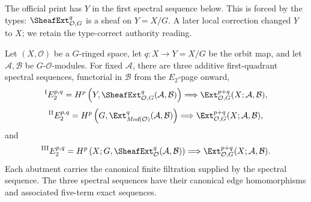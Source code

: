 \begin{lemma}
\label{lemma-equivariant-ext-spectral-sequences}
\begin{reference}
\cite[Chapter V, \S 5.6, pp. 216--217]{Tohoku}
\end{reference}
\begin{history}
The official print has $Y$ in the first spectral sequence below. This is
forced by the types: $\SheafExt^q_{\mathcal O,G}$ is a sheaf on
$Y=X/G$. A later local correction changed $Y$ to $X$; we retain the
type-correct authority reading.
\end{history}
Let $(X,\mathcal O)$ be a $G$-ringed space, let $q:X\to Y=X/G$ be the
orbit map, and let $\mathcal A,\mathcal B$ be $G$-$\mathcal O$-modules.
For fixed $\mathcal A$, there are three additive first-quadrant spectral
sequences, functorial in $\mathcal B$ from the $E_2$-page onward,
$$
{}^{\mathrm I}E_2^{p,q}
=
H^p\left(
Y,\SheafExt^q_{\mathcal O,G}(\mathcal A,\mathcal B)
\right)
\Longrightarrow
\Ext^{p+q}_{\mathcal O,G}(X;\mathcal A,\mathcal B),
$$
$$
{}^{\mathrm {II}}E_2^{p,q}
=
H^p\left(
G,\Ext^q_{\textit{Mod}(\mathcal O)}(\mathcal A,\mathcal B)
\right)
\Longrightarrow
\Ext^{p+q}_{\mathcal O,G}(X;\mathcal A,\mathcal B),
$$
and
$$
{}^{\mathrm {III}}E_2^{p,q}
=
H^p\left(
X;G,\SheafExt^q_{\mathcal O}(\mathcal A,\mathcal B)
\right)
\Longrightarrow
\Ext^{p+q}_{\mathcal O,G}(X;\mathcal A,\mathcal B).
$$
Each abutment carries the canonical finite filtration supplied by the
spectral sequence. The three spectral sequences have their canonical edge
homomorphisms and associated five-term exact sequences.
\end{lemma}

